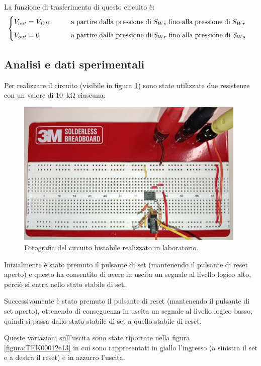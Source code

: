 \documentclass{report}
\begin{document}
La funzione di trasferimento di questo circuito è:
\begin{equation}
	\begin{cases}
		V_{out}= V_{DD}\indent\indent \mathrm{a\;partire\;dalla\;pressione\;di\;} S_{Ws} \mathrm{\;fino\;alla\;pressione\;di\;} S_{Wr}\\[5pt]
		V_{out}= 0\indent\indent\indent \mathrm{a\;partire\;dalla\;pressione\;di\;} S_{Wr} \mathrm{\;fino\;alla\;pressione\;di\;} S_{Ws}\\ %
	\end{cases}
\end{equation}

\subsection{Analisi e dati sperimentali}
Per realizzare il circuito (visibile in figura \ref{figura:circuito2}) sono state utilizzate due resistenze con un valore di \SI{10}{\kilo\ohm} ciascuna.

\begin{figure}[h!]
	\centering
	\includegraphics[height=7cm]{immagini/circuito2}
	\caption{Fotografia del circuito bistabile realizzato in laboratorio.}
	\label{figura:circuito2}
\end{figure}

\noindent Inizialmente è stato premuto il pulsante di set (mantenendo il pulsante di reset aperto) e questo ha consentito di avere in uscita un segnale al livello logico alto, perciò si entra nello stato stabile di set.

Successivamente è stato premuto il pulsante di reset (mantenendo il pulsante di set aperto), ottenendo di conseguenza in uscita un segnale al livello logico basso, quindi si passa dallo stato stabile di set a quello stabile di reset.

Queste variazioni sull'uscita sono state riportate nella figura \ref{figura:TEK00012e13} in cui sono rappresentati in giallo l'ingresso (a sinistra il set e a destra il reset) e in azzurro l'uscita.
\end{document}
